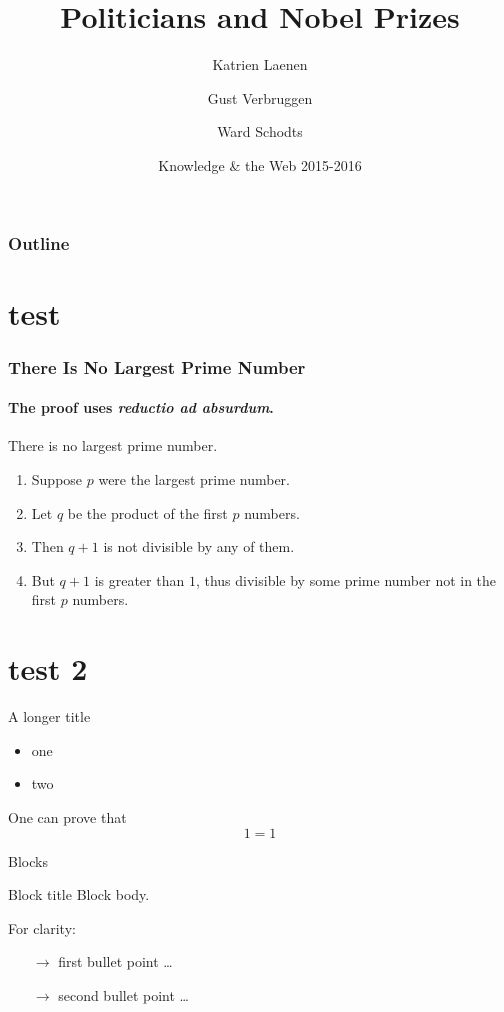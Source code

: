 \documentclass[nonav,sleutel]{beamer}
\title{Politicians and Nobel Prizes}
\date[ISPN '80]{Knowledge \& the Web 2015-2016}
\author{Katrien Laenen \and Gust Verbruggen \and Ward Schodts}
\begin{document}

\begin{frame}
\titlepage
\end{frame}


\begin{frame}[noframenumbering]
\frametitle{Outline} 
  \tableofcontents

\end{frame}



\section{test}
\begin{frame}
\frametitle{There Is No Largest Prime Number} 
\framesubtitle{The proof uses \textit{reductio ad absurdum}.} 
\begin{theorem}
There is no largest prime number. \end{theorem} 
\begin{enumerate} 
\item<1-| alert@1> Suppose $p$ were the largest prime number. 
\item<2-> Let $q$ be the product of the first $p$ numbers. 
\item<3-> Then $q+1$ is not divisible by any of them. 
\item<1-> But $q + 1$ is greater than $1$, thus divisible by some prime
number not in the first $p$ numbers.
\end{enumerate}
\end{frame}

\section{test 2}
\begin{frame}{A longer title}
\begin{itemize}
\item one
\item two
\end{itemize}

One can prove that
\[
	1 = 1
\]
\end{frame}

\begin{frame}{Blocks}
\begin{block}{Block title}
Block body.
\end{block}
\begin{example}
For clarity:
\begin{itemize}
	\item[$\rightarrow$] first bullet point \ldots
	\item[$\rightarrow$] second bullet  point \ldots
\end{itemize}
\end{example}
\end{frame}
\end{document}
